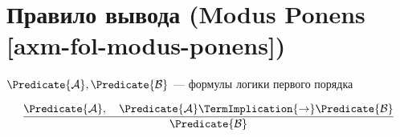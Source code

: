 
\section{Правило вывода (Modus Ponens [axm-fol-modus-ponens])}

\hypertarget{axm-fol-modus-ponens}{}
\begin{axiom}
\label{entity:axm-fol-modus-ponens}
$\Predicate{\mathcal{A}}, \Predicate{\mathcal{B}}$ --- формулы логики первого порядка

\[
\frac{\Predicate{\mathcal{A}}, \quad \Predicate{\mathcal{A}} \TermImplication{\to} \Predicate{\mathcal{B}}}{\Predicate{\mathcal{B}}}
\]
\end{axiom}